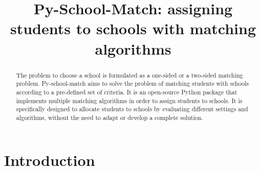\documentclass[twocolumn]{bmcart}
\begin{document}
	
		\begin{frontmatter}
			
			\begin{fmbox}
				
				
				\title{Py-School-Match: assigning students to schools with matching algorithms}
				
				
				\author[
				addressref={aff1},
				email={ankits@mun.ca}
				]{ }
				
				
				
				\address[id=aff1]{%
					}
				
				\begin{abstractbox}
					
					\begin{abstract} %
						The problem to choose a school is formulated as a one-sided or a two-sided matching problem. Py-school-match aims to solve the problem of matching students with schools according to a pre-defined set of criteria. It is an open-source Python package that implements multiple matching algorithms in order to assign students to schools.  It is specifically designed to allocate students to schools by evaluating different settings and algorithms, without the need to adapt or develop a complete solution. 
					\end{abstract}
					
					\begin{keyword}
					\end{keyword}
					
					
				\end{abstractbox}
			\end{fmbox}%
			
		\end{frontmatter}
		
		
		\section*{Introduction}
		\vspace{\baselineskip}
		
\end{document}
